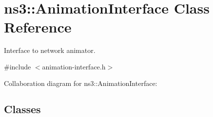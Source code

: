 \hypertarget{classns3_1_1AnimationInterface}{}\section{ns3\+:\+:Animation\+Interface Class Reference}
\label{classns3_1_1AnimationInterface}


Interface to network animator.  




{\ttfamily \#include $<$animation-\/interface.\+h$>$}



Collaboration diagram for ns3\+:\+:Animation\+Interface\+:
\subsection*{Classes}
